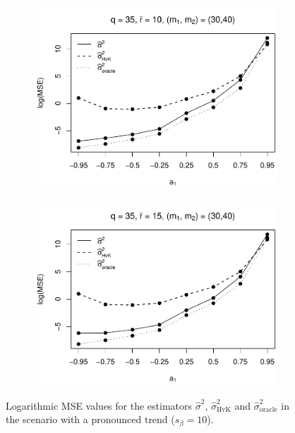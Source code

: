 \begin{figure}[p]
\begin{subfigure}[b]{0.45\textwidth}
\includegraphics[width=\textwidth]{Plots/Robustness/MSE_lrv_T=500_slope=10_(q,r,M1,M2)=(35,10,30,40).pdf}
\end{subfigure}
\hspace{0.25cm}
\begin{subfigure}[b]{0.45\textwidth}
\includegraphics[width=\textwidth]{Plots/Robustness/MSE_lrv_T=500_slope=10_(q,r,M1,M2)=(35,15,30,40).pdf}
\end{subfigure}
\caption{Logarithmic MSE values for the estimators $\widehat{\sigma}^2$, $\widehat{\sigma}^2_{\text{HvK}}$ and $\widehat{\sigma}^2_{\text{oracle}}$ in the scenario with a pronounced trend ($s_\beta=10$).}\label{fig:MSE_slope10_lrv_robust} 
\end{figure}

